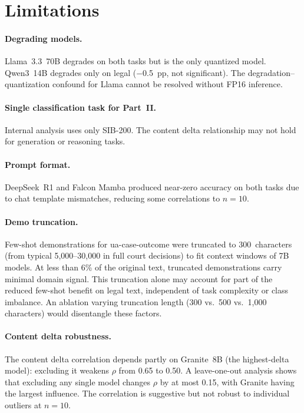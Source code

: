 \documentclass[11pt,a4paper]{article}
\begin{document}
\section{Limitations}

\paragraph{Degrading models.} Llama~3.3~70B degrades on both tasks but is the only quantized model. Qwen3~14B degrades only on legal ($-$0.5~pp, not significant). The degradation--quantization confound for Llama cannot be resolved without FP16 inference.

\paragraph{Single classification task for Part~II.} Internal analysis uses only SIB-200. The content delta relationship may not hold for generation or reasoning tasks.

\paragraph{Prompt format.} DeepSeek~R1 and Falcon Mamba produced near-zero accuracy on both tasks due to chat template mismatches, reducing some correlations to $n = 10$.

\paragraph{Demo truncation.} Few-shot demonstrations for ua-case-outcome were truncated to 300~characters (from typical 5,000--30,000 in full court decisions) to fit context windows of 7B models. At less than 6\% of the original text, truncated demonstrations carry minimal domain signal. This truncation alone may account for part of the reduced few-shot benefit on legal text, independent of task complexity or class imbalance. An ablation varying truncation length (300 vs.\ 500 vs.\ 1,000 characters) would disentangle these factors.

\paragraph{Content delta robustness.} The content delta correlation depends partly on Granite~8B (the highest-delta model): excluding it weakens $\rho$ from 0.65 to 0.50. A leave-one-out analysis shows that excluding any single model changes $\rho$ by at most 0.15, with Granite having the largest influence. The correlation is suggestive but not robust to individual outliers at $n = 10$.
\end{document}

